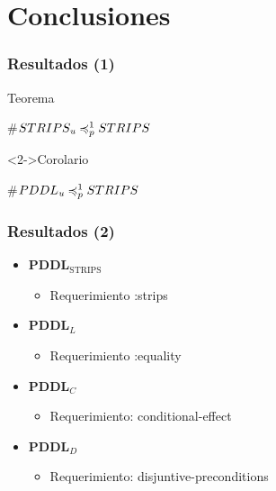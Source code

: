 \documentclass[bigger]{beamer}
\begin{document}
\section{Conclusiones}
\label{sec-6}
\begin{frame}
\frametitle{Resultados (1)}
\label{sec-6.1}
\begin{block}{Teorema}
\label{sec-6.1.1}

#$STRIPS_{\emph{u}} \preccurlyeq^{1}_{p} STRIPS$
\end{block}
\begin{block}<2->{Corolario}
\label{sec-6.1.2}

#$PDDL_{\emph{u}} \preccurlyeq^{1}_{p} STRIPS$
\end{block}
\end{frame}
\begin{frame}[<+->]
\frametitle{Resultados (2)}
\label{sec-6.2}
\begin{itemize}

\item \textbf{PDDL$_{\mathrm{STRIPS}}$}
\label{sec-6.2.1}%
\begin{itemize}

\item Requerimiento :strips\\
\label{sec-6.2.1.1}%
\end{itemize} %

\item \textbf{PDDL$_{L}$}
\label{sec-6.2.2}%
\begin{itemize}

\item Requerimiento :equality\\
\label{sec-6.2.2.1}%
\end{itemize} %

\item \textbf{PDDL$_{C}$}
\label{sec-6.2.3}%
\begin{itemize}

\item Requerimiento: conditional-effect\\
\label{sec-6.2.3.1}%
\end{itemize} %

\item \textbf{PDDL$_{D}$}
\label{sec-6.2.4}%
\begin{itemize}

\item Requerimiento: disjuntive-preconditions\\
\label{sec-6.2.4.1}%
\end{itemize} %
\end{itemize} %
\end{frame}
\end{document}

